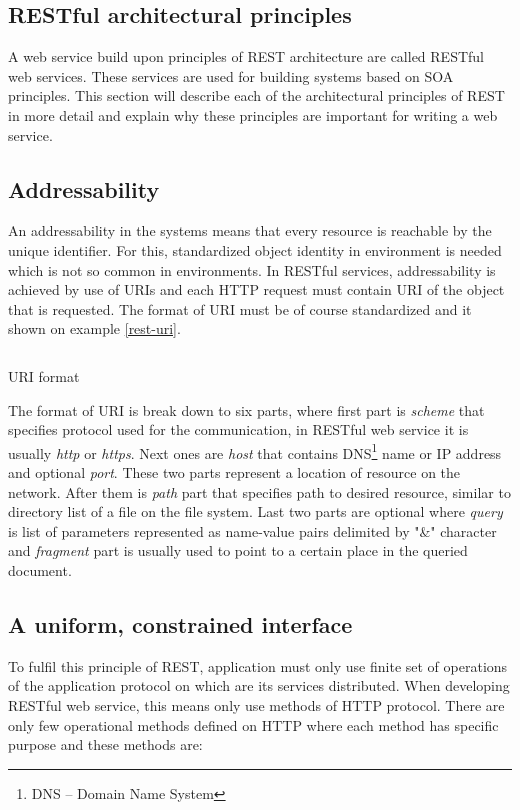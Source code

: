 \documentclass[12pt,final,oneside]{fithesis2}
\begin{document}
\subsection{RESTful architectural principles}
A web service build upon principles of REST architecture are called RESTful web services. These services are used for building systems based on SOA principles. This section will describe each of the architectural principles of REST in more detail and explain why these principles are important for writing a web service.


\subsection*{Addressability}
An addressability in the systems means that every resource is reachable by the unique identifier. For this, standardized object identity in environment is needed which is not so common in environments. In RESTful services, addressability is achieved by use of URIs and each HTTP request must contain URI of the object that is requested. The format of URI must be of course standardized and it shown on example \ref{rest-uri}.

\begin{listing}[ht]
	\inputminted[]{bash}{sources/rest-uri.java}
	\caption{URI format}
	\label{rest-uri}
\end{listing}

The format of URI is break down to six parts, where first part is \textit{scheme} that specifies protocol used for the communication, in RESTful web service it is usually \textit{http} or \textit{https}. Next ones are \textit{host} that contains DNS\footnote{DNS -- Domain Name System} name or IP address and optional \textit{port}. These two parts represent a location of resource on the network. After them is \textit{path} part that specifies path to desired resource, similar to directory list of a file on the file system. Last two parts are optional where \textit{query} is list of parameters represented as name-value pairs delimited by "\&" character and \textit{fragment} part is usually used to point to a certain place in the queried document.

\subsection*{A uniform, constrained interface}
To fulfil this principle of REST, application must only use finite set of operations of the application protocol on which are its services distributed. When developing RESTful web service, this means only use methods of HTTP protocol. There are only few operational methods defined on HTTP where each method has specific purpose and these methods are:
\end{document}
